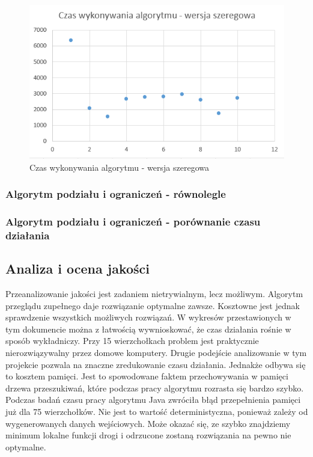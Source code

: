 \documentclass{article}
\begin{document}
		\begin{figure}[H]
			\centering
			\includegraphics[width=0.9\linewidth]{bbS2}
			\caption{Czas wykonywania algorytmu - wersja szeregowa}
		\end{figure}
	
	
		\subsubsection{Algorytm podziału i ograniczeń - równolegle}
			
		
		\subsubsection{Algorytm podziału i ograniczeń - porównanie czasu działania}
			
	
	
	
	\subsection{Analiza i ocena jakości}
		Przeanalizowanie jakości jest zadaniem nietrywialnym, lecz możliwym. Algorytm przeglądu zupełnego daje rozwiązanie optymalne zawsze. Kosztowne jest jednak sprawdzenie wszystkich możliwych rozwiązań. W wykresów przestawionych w tym dokumencie można z łatwością wywnioskować, że czas działania rośnie w sposób wykładniczy. Przy 15 wierzchołkach problem jest praktycznie nierozwiązywalny przez domowe komputery. Drugie podejście analizowanie w tym projekcie pozwala na znaczne zredukowanie czasu działania. Jednakże odbywa się to kosztem pamięci. Jest to spowodowane faktem przechowywania w pamięci drzewa przeszukiwań, które podczas pracy algorytmu rozrasta się bardzo szybko. Podczas badań czasu pracy algorytmu Java zwróciła błąd przepełnienia pamięci już dla 75 wierzchołków. Nie jest to wartość deterministyczna, ponieważ zależy od wygenerowanych danych wejściowych. Może okazać się, ze szybko znajdziemy minimum lokalne funkcji drogi i odrzucone zostaną rozwiązania na pewno nie optymalne.
\end{document}
